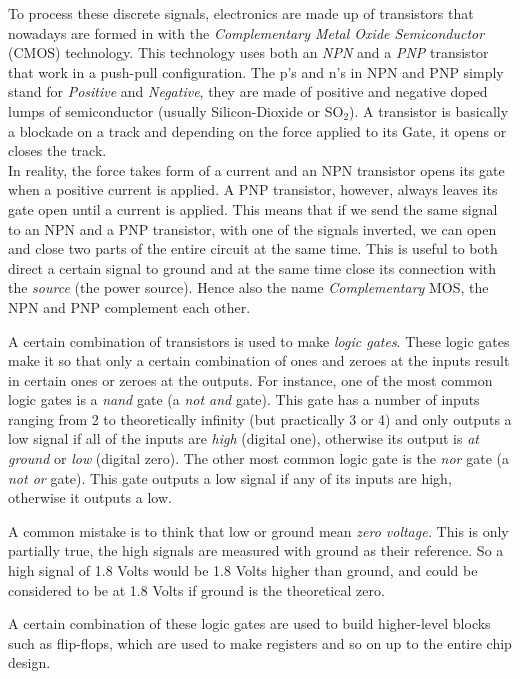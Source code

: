 \documentclass[11pt,british]{article}
\begin{document}
To process these discrete signals, electronics are made up of transistors
that nowadays are formed in with the \emph{Complementary Metal Oxide
Semiconductor }(CMOS) technology. This technology uses both an \emph{NPN}
and a \emph{PNP} transistor that work in a push-pull configuration.
The p's and n's in NPN and PNP simply stand for \emph{Positive} and
\emph{Negative}, they are made of positive and negative doped lumps
of semiconductor (usually Silicon-Dioxide or SO$_{2}$). A transistor
is basically a blockade on a track and depending on the force applied
to its Gate, it opens or closes the track.\\


In reality, the force takes form of a current and an NPN transistor
opens its gate when a positive current is applied. A PNP transistor,
however, always leaves its gate open until a current is applied. This
means that if we send the same signal to an NPN and a PNP transistor,
with one of the signals inverted, we can open and close two parts
of the entire circuit at the same time. This is useful to both direct
a certain signal to ground and at the same time close its connection
with the \emph{source} (the power source). Hence also the name \emph{Complementary}
MOS, the NPN and PNP complement each other.

A certain combination of transistors is used to make \emph{logic gates}.
These logic gates make it so that only a certain combination of ones
and zeroes at the inputs result in certain ones or zeroes at the outputs.
For instance, one of the most common logic gates is a \emph{nand }gate
(a \emph{not and }gate). This gate has a number of inputs ranging
from 2 to theoretically infinity (but practically 3 or 4) and only
outputs a low\emph{ }signal if all of the inputs are \emph{high} (digital
one), otherwise its output is \emph{at ground} or \emph{low} (digital
zero). The other most common logic gate is the \emph{nor }gate (a
\emph{not or }gate). This gate outputs a low signal if any of its
inputs are high, otherwise it outputs a low.

A common mistake is to think that low or ground mean \emph{zero voltage.}
This is only partially true, the high signals are measured with ground
as their reference. So a high signal of 1.8 Volts would be 1.8 Volts
higher than ground, and could be considered to be at 1.8 Volts if
ground is the theoretical zero.

A certain combination of these logic gates are used to build higher-level
blocks such as flip-flops, which are used to make registers and so
on up to the entire chip design.
\end{document}
